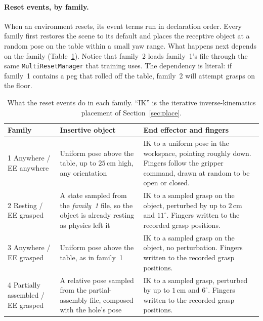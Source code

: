 \documentclass{article}
\newcommand{\code}[1]{\texttt{#1}}
\begin{document}
\paragraph{Reset events, by family.}
When an environment resets, its event terms run in declaration order. Every family first restores the scene to its default and places the receptive object at a random pose on the table within a small yaw range. What happens next depends on the family (Table~\ref{tab:events}). Notice that family~2 loads family~1's file through the same \code{MultiResetManager} that training uses. The dependency is literal: if family~1 contains a peg that rolled off the table, family~2 will attempt grasps on the floor.

\begin{table}[t]
\centering
\caption{What the reset events do in each family. ``IK'' is the iterative inverse-kinematics placement of Section~\ref{sec:place}.}
\label{tab:events}
\small
\begin{tabular}{@{}p{3.1cm}p{4.4cm}p{5.4cm}@{}}
\toprule
Family & Insertive object & End effector and fingers\\
\midrule
1 Anywhere / EE anywhere & Uniform pose above the table, up to $25$\,cm high, any orientation & IK to a uniform pose in the workspace, pointing roughly down. Fingers follow the gripper command, drawn at random to be open or closed.\\
2 Resting / EE grasped & A state sampled from the \emph{family~1} file, so the object is already resting as physics left it & IK to a sampled grasp on the object, perturbed by up to $2$\,cm and $11^\circ$. Fingers written to the recorded grasp positions.\\
3 Anywhere / EE grasped & Uniform pose above the table, as in family~1 & IK to a sampled grasp on the object, no perturbation. Fingers written to the recorded grasp positions.\\
4 Partially assembled / EE grasped & A relative pose sampled from the partial-assembly file, composed with the hole's pose & IK to a sampled grasp, perturbed by up to $1$\,cm and $6^\circ$. Fingers written to the recorded grasp positions.\\
\bottomrule
\end{tabular}
\end{table}
\end{document}
